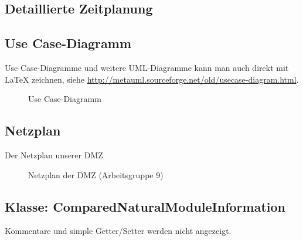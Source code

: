 
 

\subsection{Detaillierte Zeitplanung}
\label{app:Zeitplanung}



\clearpage

\subsection{Use Case-Diagramm}
\label{app:UseCase}
Use Case-Diagramme und weitere \acs{UML}-Diagramme kann man auch direkt mit \LaTeX{} zeichnen, siehe \zB \url{http://metauml.sourceforge.net/old/usecase-diagram.html}.
\begin{figure}[htb]
\centering
{}
\caption{Use Case-Diagramm}
\end{figure}



\subsection{Netzplan}
\label{app:Netzplan}
Der Netzplan unserer \acs{DMZ}
\begin{figure}[htb]
\centering
{}
\caption{Netzplan der DMZ (Arbeitsgruppe 9)}
\end{figure}
\clearpage


\clearpage


\clearpage


\subsection{Klasse: ComparedNaturalModuleInformation}
\label{app:CNMI}
Kommentare und simple Getter/Setter werden nicht angezeigt.

\clearpage

